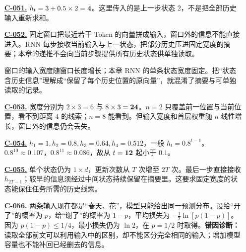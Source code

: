 \begin{enumerate}[label={},leftmargin=4.8em,itemsep=4pt]
\item[\textbf{\hyperref[exercise:rnn-one-step]{C-051.}}] \leavevmode{}\label{solution:C-051}\label{solution:rnn-one-step}$h_t=3+0.5\times2=\boldsymbol{4}$。这里传入的是上一步状态 $2$，不是把全部历史输入重新求和。
\item[\textbf{\hyperref[exercise:history-model-comparison]{C-052.}}] \leavevmode{}\label{solution:C-052}\label{solution:history-model-comparison}固定窗口把最近若干 Token 的向量拼成输入，窗口外的信息不能直接进入。RNN 每步接收当前输入与上一状态，把部分历史压进固定宽度的摘要；本章的递推不会向当前步骤提供所有历史状态供单独读取。\par 窗口的输入宽度随窗口长度增长；本章 RNN 的单条状态宽度固定。把“状态含历史信息”理解成“保留了每个历史位置的原向量”，就混淆了摘要与可单独读取的记录。
\item[\textbf{\hyperref[exercise:window-input-width]{C-053.}}] \leavevmode{}\label{solution:C-053}\label{solution:window-input-width}宽度分别为 $2\times3=6$ 与 $8\times3=\boldsymbol{24}$。$n=2$ 只覆盖前一位置与当前位置，看不到距离 $4$ 的线索；$n=8$ 能看到。但输入宽度和首层权重随 $n$ 线性增长，窗口外的信息仍会丢失。
\item[\textbf{\hyperref[exercise:rnn-decay]{C-054.}}] \leavevmode{}\label{solution:C-054}\label{solution:rnn-decay}$h_1=1,h_2=0.8,h_3=0.64,h_4=0.512$，一般 $h_t=0.8^{t-1}$。$0.8^{10}\approx0.107$，$0.8^{11}\approx0.086$，故从 $t=\boldsymbol{12}$ 起小于 $0.1$。
\item[\textbf{\hyperref[exercise:rnn-state-scaling]{C-055.}}] \leavevmode{}\label{solution:C-055}\label{solution:rnn-state-scaling}单个状态仍为 $1\times d$，更新次数从 $T$ 次增至 $2T$ 次。最后一步直接接收 $h_{2T-1}$；较早的信息须经过中间状态持续保留在摘要里。这要求固定宽度的状态能保住任务所需的历史线索。
\item[\textbf{\hyperref[exercise:context-conflicting-labels]{C-056.}}] \leavevmode{}\label{solution:C-056}\label{solution:context-conflicting-labels}两条输入现在都是“春天、花”，模型只能给出同一预测分布。设给“开了”的概率为 $p$，给“谢了”的概率为 $1-p$，平均损失为 $-\tfrac12\ln[p(1-p)]$。因为 $p(1-p)\leq1/4$，最小损失仍为 $\ln2$，在 $p=1/2$ 时取得。\textbf{错因诊断：}读取全部前文可以利用输入中的区别，却不能区分完全相同的输入；增加模型容量也不能补回已经删去的信息。
\end{enumerate}
